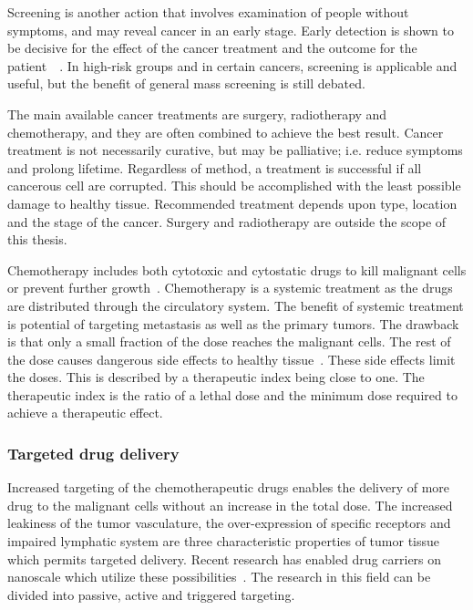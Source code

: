 Screening is another action that involves examination of people without symptoms, and may reveal cancer in an early stage. Early detection is shown to be decisive for the effect of the cancer treatment and the outcome for the patient~\cite{king2006cancer}~\cite{Jordan1986}. In high-risk groups and in certain cancers,  screening is applicable and useful, but the benefit of general mass screening is still debated. 

The main available cancer treatments are surgery, radiotherapy and chemotherapy, and they are often combined to achieve the best result. Cancer treatment is not necessarily curative, but may be palliative; i.e. reduce symptoms and prolong lifetime. Regardless of method, a treatment is successful if all cancerous cell are corrupted. This should be accomplished with the least possible damage to healthy tissue. Recommended treatment depends upon type, location and the stage of the cancer. Surgery and radiotherapy are outside the scope of this thesis.

Chemotherapy includes both cytotoxic and cytostatic drugs to kill malignant cells or prevent further growth~\cite{Skeel2011}. Chemotherapy is a systemic treatment as the drugs are distributed through the circulatory system. The benefit of systemic treatment is potential of targeting metastasis as well as the primary tumors. The drawback is that only a small fraction of the dose reaches the malignant cells. The rest of the dose causes dangerous side effects to healthy tissue~\cite{doi:10.1056/NEJM200106283442607}. These side effects limit the doses. This is described by a therapeutic index being close to one. The therapeutic index is the ratio of a lethal dose and the minimum dose required to achieve a therapeutic effect.
 
\subsubsection{Targeted drug delivery}
Increased targeting of the chemotherapeutic drugs enables the delivery of more drug to the malignant cells without an increase in the total dose. The increased leakiness of the tumor vasculature, the over-expression of specific receptors and impaired lymphatic system are three characteristic properties of tumor tissue which permits targeted delivery. Recent research has enabled drug carriers on nanoscale which utilize these possibilities~\cite{Jafari}. The research in this field can be divided into passive, active and triggered targeting. 

